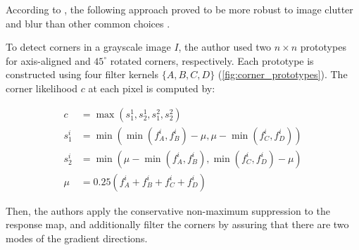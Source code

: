 According to \cite{geigerAutomaticCameraRange2012}, the following approach proved to be
more robust to image clutter and blur than other common choices
\citep{harrisCombinedCornerEdge1988, shiGoodFeaturesTrack2000}.

To detect corners in a grayscale image $I$, the author used two $n \times n$ prototypes
for axis-aligned and $45^{\circ}$ rotated corners, respectively.
Each prototype
is constructed using four filter kernels $\{A, B, C, D\}$ (\cref{fig:corner_prototypes}). The corner likelihood
$c$ at each pixel is computed by:

\begin{equation}
	\begin{aligned}
		c     & =\max \left(s_1^1, s_2^1, s_1^2, s_2^2\right)                                             \\
		s_1^i & =\min \left(\min \left(f_A^i, f_B^i\right)-\mu, \mu-\min \left(f_C^i, f_D^i\right)\right) \\
		s_2^i & =\min \left(\mu-\min \left(f_A^i, f_B^i\right), \min \left(f_C^i, f_D^i\right)-\mu\right) \\
		\mu   & =0.25\left(f_A^i+f_B^i+f_C^i+f_D^i\right)
	\end{aligned}
\end{equation}

Then, the authors apply the conservative non-maximum suppression to the
response map, and additionally filter the corners by assuring that there are two
modes of the gradient directions.

%
%
%
%
%

